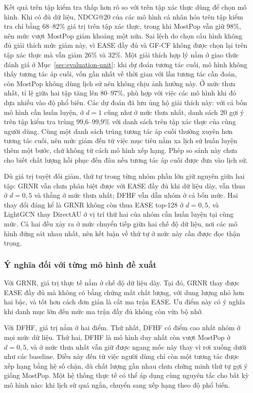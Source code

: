 Kết quả trên tập kiểm tra thấp hơn rõ so với trên tập xác thực dùng để chọn mô hình. Khi có đủ dữ liệu, NDCG@20 của các mô hình cá nhân hóa trên tập kiểm tra chỉ bằng 68--82\% giá trị trên tập xác thực, trong khi MostPop vẫn giữ 98\%, nên mức vượt MostPop giảm khoảng một nửa. Sai lệch do chọn cấu hình không đủ giải thích mức giảm này, vì EASE đầy đủ và GF-CF không được chọn lại trên tập xác thực mà vẫn giảm 26\% và 32\%. Một giải thích hợp lý nằm ở giao thức đánh giá ở Mục~\ref{sec:evaluation-unit}: khi dự đoán tương tác cuối, mô hình không thấy tương tác áp cuối, vốn gần nhất về thời gian với lần tương tác cần đoán, còn MostPop không dùng lịch sử nên không chịu ảnh hưởng này. Ở mức thưa nhất, tỉ lệ giữa hai tập tăng lên 80--97\%, phù hợp với việc các mô hình khi đó dựa nhiều vào độ phổ biến. Các dự đoán đã lưu ủng hộ giải thích này: với cả bốn mô hình cần huấn luyện, ở $d=1$ cũng như ở mức thưa nhất, danh sách 20 gợi ý trên tập kiểm tra trùng 99,6--99,9\% với danh sách trên tập xác thực của cùng người dùng. Cùng một danh sách trúng tương tác áp cuối thường xuyên hơn tương tác cuối, nên mức giảm đến từ việc mục tiêu nằm xa lịch sử huấn luyện thêm một bước, chứ không từ cách mô hình xếp hạng. Phép so sánh này chưa cho biết chất lượng hồi phục đến đâu nếu tương tác áp cuối được đưa vào lịch sử.

Dù giá trị tuyệt đối giảm, thứ tự trong từng nhóm phần lớn giữ nguyên giữa hai tập: GRNR vẫn chưa phân biệt được với EASE đầy đủ khi dữ liệu dày, vẫn thua ở $d=0{,}5$ và thắng ở mức thưa nhất; DFHF vẫn dẫn nhóm ở cả bốn mức. Hai thay đổi đáng kể là GRNR không còn thua EASE top-128 ở $d=0{,}5$, và LightGCN thay DirectAU ở vị trí thứ hai của nhóm cần huấn luyện tại cùng mức. Cả hai đều xảy ra ở mức chuyển tiếp giữa hai chế độ dữ liệu, nơi các mô hình đứng sát nhau nhất, nên kết luận về thứ tự ở mức này cần được đọc thận trọng.

\FloatBarrier
\subsubsection{Ý nghĩa đối với từng mô hình đề xuất}
 Với GRNR, giá trị thực tế nằm ở chế độ dữ liệu dày. Tại đó, GRNR thay được EASE đầy đủ mà không có bằng chứng mất chất lượng, với dung lượng nhỏ hơn hai bậc, và tốt hơn cách đơn giản là cắt ma trận EASE. Ưu điểm này có ý nghĩa khi danh mục lớn đến mức ma trận đầy đủ không còn vừa bộ nhớ.

Với DFHF, giá trị nằm ở hai điểm. Thứ nhất, DFHF có điểm cao nhất nhóm ở mọi mức dữ liệu. Thứ hai, DFHF là mô hình duy nhất còn vượt MostPop ở $d=0{,}5$, và ở mức thưa nhất vẫn giữ được ngang mốc này thay vì rơi xuống dưới như các baseline. Điều này đến từ việc người dùng chỉ còn một tương tác được xếp hạng bằng hệ số chặn, dù chất lượng gần nhau chưa chứng minh thứ tự gợi ý giống MostPop. Một hệ thống thực tế có thể áp dụng cùng nguyên tắc cho bất kỳ mô hình nào: khi lịch sử quá ngắn, chuyển sang xếp hạng theo độ phổ biến.

